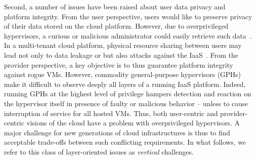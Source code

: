 \documentclass{sig-alternate}
\begin{document}
Second, a number of issues have been raised about user data privacy and platform integrity. From the user perspective, users would like to preserve privacy of their data stored on the cloud platform. However, due to overprivileged hypervisors, a curious or malicious administrator could easily retrieve such data~\cite{cloudvisor:zhang}. In a multi-tenant cloud platform, physical resource sharing between users may lead not only to data leakage or but also attacks against the IaaS~\cite{bot:att, sec:you}.
From the provider perspective, a key objective is to thus guarantee platform integrity against rogue VMs. However, commodity general-purpose hypervisors (GPHs) make it difficult to observe deeply all layers of a running IaaS platform. Indeed, running GPHs at the highest level of privilege hampers detection and reaction on the hypervisor itself in presence of faulty or malicious behavior -- unless to cause interruption of service for all hosted VMs. Thus, both user-centric and provider-centric visions of the cloud have a problem with overprivileged hypervisors.
A major challenge for new generations of cloud infrastructures is thus to find acceptable trade-offs between such conflicting requirements. In what follows, we refer to this class of layer-oriented issues as \textit{vertical} challenges.
\end{document}

